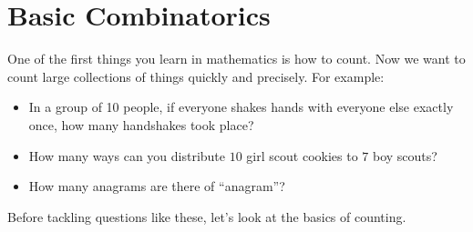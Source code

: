 \documentclass[10pt,]{book}
\theoremstyle{plain}
\theoremstyle{definition}
\theoremstyle{definition}
\theoremstyle{definition}
\numberwithin{equation}{chapter}
\begin{document}
\chapter[{Basic Combinatorics}]{Basic Combinatorics}\label{ch_basic-combinatorics}
\hypertarget{p-467}{}%
One of the first things you learn in mathematics is how to count. Now we want to count large collections of things quickly and precisely. For example: \leavevmode%
\begin{itemize}[label=\textbullet]
\item{}\hypertarget{p-468}{}%
In a group of 10 people, if everyone shakes hands with everyone else exactly once, how many handshakes took place?%
\item{}\hypertarget{p-469}{}%
How many ways can you distribute \(10\) girl scout cookies to \(7\) boy scouts?%
\item{}\hypertarget{p-470}{}%
How many anagrams are there of ``anagram''?%
\end{itemize}
%
\par
\hypertarget{p-471}{}%
Before tackling questions like these, let's look at the basics of counting.%
\typeout{************************************************}
\typeout{************************************************}
\end{document}
